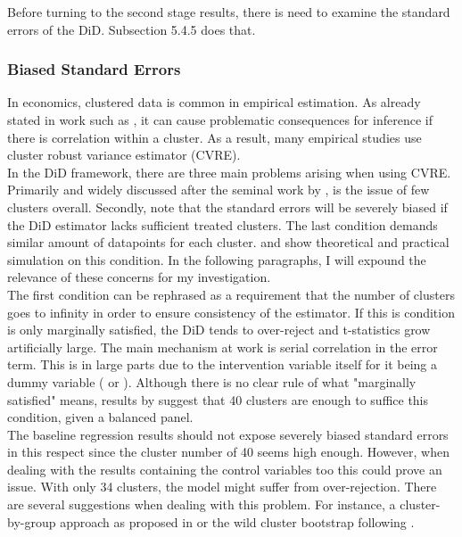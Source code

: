 \documentclass{article}
\begin{document}
Before turning to the second stage results, there is need to examine the standard errors of the DiD. Subsection 5.4.5 does that.

\subsubsection{Biased Standard Errors}

In economics, clustered data is common in empirical estimation. As already stated in work such as \cite{moulton1990illustration}, it can cause problematic consequences for inference if there is correlation within a cluster. As a result, many empirical studies use cluster robust variance estimator (CVRE).\\
In the DiD framework, there are three main problems arising when using CVRE. Primarily and widely discussed after the seminal work by \cite{bertrand2004much}, is the issue of few clusters overall. Secondly, \cite{conley2011inference} note that the standard errors will be severely biased if the DiD estimator lacks sufficient treated clusters. The last condition demands similar amount of datapoints for each cluster. \cite{carter2017asymptotic} and \cite{mackinnon2017wild} show theoretical and practical simulation on this condition. In the following paragraphs, I will expound the relevance of these concerns for my investigation. \\
The first condition can be rephrased as a requirement that the number of clusters goes to infinity in order to ensure consistency of the estimator. If this is condition is only marginally satisfied, the DiD tends to over-reject and t-statistics grow artificially large. The main mechanism at work is serial correlation in the error term. This is in large parts due to the intervention variable itself for it being a dummy variable (\cite{bertrand2004much} or \cite{donald2007inference}). Although there is no clear rule of what "marginally satisfied" means, results by \cite{cameron2008bootstrap} suggest that 40 clusters are enough to suffice this condition, given a balanced panel. \\
The baseline regression results should not expose severely biased standard errors in this respect since the cluster number of 40 seems high enough. However, when dealing with the results containing the control variables too this could prove an issue. With only 34 clusters, the model might suffer from over-rejection. There are several suggestions when dealing with this problem. For instance, a cluster-by-group approach as proposed in \cite{bertrand2004much} or the wild cluster bootstrap following \cite{cameron2008bootstrap}. \\
\end{document}
